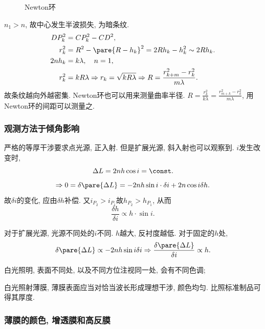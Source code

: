 \documentclass{ctexart}
\begin{document}
\begin{figure}[ht]
    \centering
    \caption{Newton环}
\end{figure}
$n_1>n$, 故中心发生半波损失, 为暗条纹.
\begin{align*}
    DP_k^2 &= CP_k^2 - CD^2,\\
    r_k^2 &= R^2 - \pare{R-h_k}^2 = 2Rh_k - h_k^2 \sim 2Rh_k. \\
    2nh_k &= k\lambda,\quad n = 1,\\
    r_k^2 &= kR\lambda \Rightarrow r_k = \sqrt{kR\lambda} \Rightarrow R = \frac{r_{k+m}^2 - r_k^2}{m\lambda}.
\end{align*}
故条纹越向外越密集. Newton环也可以用来测量曲率半径. $R = \displaystyle \frac{r_k^2}{k\lambda} = \frac{r_{m+k}^2 - r_k^2}{m\lambda}$, 用Newton环的间距可以测量之.


\subsubsection{观测方法于倾角影响} %
\label{ssub:观测方法于倾角影响}

严格的等厚干涉要求点光源, 正入射. 但是扩展光源, 斜入射也可以观察到. $i$发生改变时,
\[ \Delta L = 2nh\cos i = \const. \]
\[ \Rightarrow 0 = \delta \pare{\Delta L} = -2nh\sin i\cdot \delta i + 2n\cos i\delta h. \]
故$\delta i$的变化, 应由$\delta h$补偿. 又$i_{P_2}>i_{P_1}$故$h_{P_2} > h_{P_1}$, 从而
\[ \frac{\delta h}{\delta i} \propto h\cdot \sin i. \]
\par
对于扩展光源, 光源不同处的$i$不同. $h$越大, 反衬度越低. 对于固定的$h$处,
\[ \delta\pare{\Delta L} \propto -2nh\sin i\delta i\Rightarrow \frac{\delta\pare{\Delta L}}{\delta i} \propto h. \]
\begin{cenum}
    \item 白光照明, 表面不同处, 以及不同方位注视同一处, 会有不同色调;
    \item 白光照射薄膜, 薄膜表面应当对恰当波长形成理想干涉,  颜色均匀. 比照标准制品可得其厚度.
\end{cenum}


\subsubsection{薄膜的颜色, 增透膜和高反膜} %
\label{ssub:薄膜的颜色_增透膜和高反膜}
\end{document}
